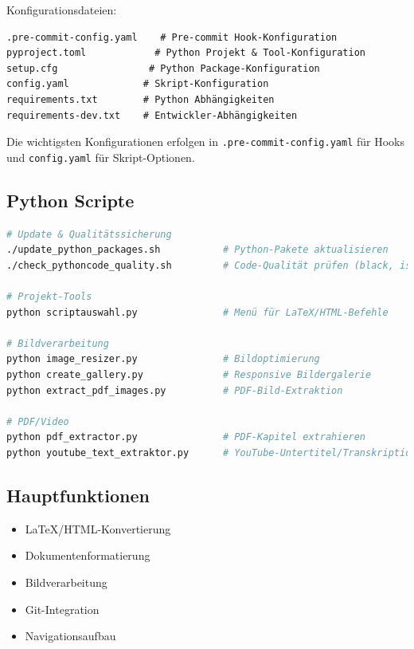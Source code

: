 \documentclass{content/vorlage-design-main}
\begin{document}
Konfigurationsdateien:

\begin{lstlisting}
.pre-commit-config.yaml    # Pre-commit Hook-Konfiguration
pyproject.toml            # Python Projekt & Tool-Konfiguration
setup.cfg                # Python Package-Konfiguration
config.yaml             # Skript-Konfiguration
requirements.txt        # Python Abhängigkeiten
requirements-dev.txt    # Entwickler-Abhängigkeiten
\end{lstlisting}

Die wichtigsten Konfigurationen erfolgen in
\verb|.pre-commit-config.yaml| für Hooks und
\verb|config.yaml| für Skript-Optionen.

\subsection{Python Scripte}\label{python-scripte}

\begin{lstlisting}[language=bash]
# Update & Qualitätssicherung
./update_python_packages.sh           # Python-Pakete aktualisieren
./check_pythoncode_quality.sh         # Code-Qualität prüfen (black, isort, flake8, mypy)

# Projekt-Tools
python scriptauswahl.py               # Menü für LaTeX/HTML-Befehle

# Bildverarbeitung
python image_resizer.py               # Bildoptimierung
python create_gallery.py              # Responsive Bildergalerie
python extract_pdf_images.py          # PDF-Bild-Extraktion

# PDF/Video
python pdf_extractor.py               # PDF-Kapitel extrahieren
python youtube_text_extraktor.py      # YouTube-Untertitel/Transkription
\end{lstlisting}

\subsection{Hauptfunktionen}\label{hauptfunktionen}

\begin{itemize}

\item
  LaTeX/HTML-Konvertierung
\item
  Dokumentenformatierung
\item
  Bildverarbeitung
\item
  Git-Integration
\item
  Navigationsaufbau
\end{itemize}
\end{document}
